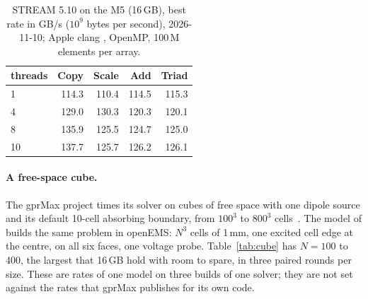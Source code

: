\begin{table}[H]\centering\small
\begin{tabular}{@{}lrrrr@{}}
\toprule
threads & Copy & Scale & Add & Triad \\
\midrule
1 & 114.3 & 110.4 & 114.5 & 115.3 \\
4 & 129.0 & 130.3 & 120.3 & 120.1 \\
8 & 135.9 & 125.5 & 124.7 & 125.0 \\
10 & 137.7 & 125.7 & 126.2 & 126.1 \\
\bottomrule
\end{tabular}
\caption{STREAM 5.10 on the M5 (16\,GB), best rate in GB/s ($10^9$ bytes per second), 2026-11-10; Apple clang
, OpenMP, 100\,M elements per array.}\label{tab:stream}
\end{table}

\paragraph{A free-space cube.}
The gprMax project times its solver on cubes of free space with one dipole source and its default 10-cell
absorbing boundary, from $100^3$ to $800^3$ cells~\cite{gprmax,gprmaxgpu}. The model  of
 builds the same problem in openEMS: $N^3$ cells of 1\,mm, one excited cell edge at the
centre,  on all six faces, one voltage probe. Table~\ref{tab:cube} has $N=100$ to 400, the largest
that 16\,GB hold with room to spare, in three paired rounds per size. These are rates of one model on three builds of
one solver; they are not set against the rates that gprMax publishes for its own code.

